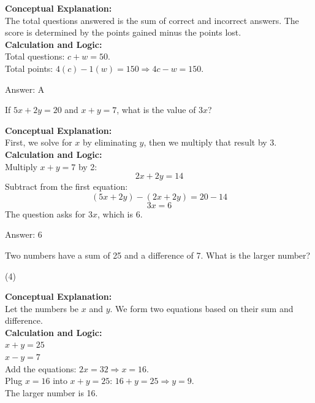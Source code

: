 \documentclass[11pt,paper=a4,answers]{exam}
\begin{document}
\begin{questions}
\begin{solution}
\textbf{Conceptual Explanation:} \\
The total questions answered is the sum of correct and incorrect answers. The score is determined by the points gained minus the points lost.
\\[10pt]
\textbf{Calculation and Logic:} \\
Total questions: $c + w = 50$. \\
Total points: $4(c) - 1(w) = 150 \Rightarrow 4c - w = 150$.

\vspace{15pt}
Answer: \colorbox{yellow!100}{A}
\end{solution}

\question
If $5x + 2y = 20$ and $x + y = 7$, what is the value of $3x$?

\begin{solution}
\textbf{Conceptual Explanation:} \\
First, we solve for $x$ by eliminating $y$, then we multiply that result by 3.
\\[10pt]
\textbf{Calculation and Logic:} \\
Multiply $x + y = 7$ by 2:
\[2x + 2y = 14\]
Subtract from the first equation:
\[(5x + 2y) - (2x + 2y) = 20 - 14\]
\[3x = 6\]
The question asks for $3x$, which is 6.

\vspace{15pt}
Answer: \colorbox{yellow!100}{6}
\end{solution}

\question
Two numbers have a sum of 25 and a difference of 7. What is the larger number?
\begin{tasks}(4)
\end{tasks}

\begin{solution}
\textbf{Conceptual Explanation:} \\
Let the numbers be $x$ and $y$. We form two equations based on their sum and difference.
\\[10pt]
\textbf{Calculation and Logic:} \\
$x + y = 25$ \\
$x - y = 7$ \\
Add the equations: $2x = 32 \Rightarrow x = 16$. \\
Plug $x = 16$ into $x + y = 25$: $16 + y = 25 \Rightarrow y = 9$. \\
The larger number is 16.


\end{solution}
\end{questions}
\end{document}

